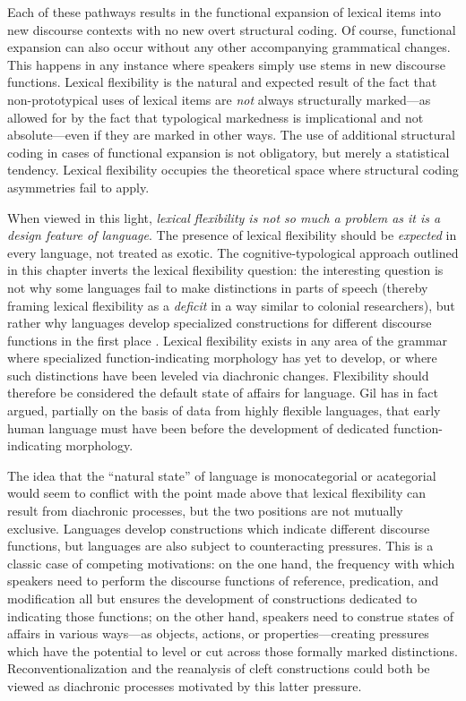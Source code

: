 Each of these pathways results in the functional expansion of lexical items into new discourse contexts with no new overt structural coding. Of course, functional expansion can also occur without any other accompanying grammatical changes. This happens in any instance where speakers simply use stems in new discourse functions. Lexical flexibility is the natural and expected result of the fact that non-prototypical uses of lexical items are \emph{not} always structurally marked—as allowed for by the fact that typological markedness is implicational and not absolute—even if they are marked in other ways. The use of additional structural coding in cases of functional expansion is not obligatory, but merely a statistical tendency. Lexical flexibility occupies the theoretical space where structural coding asymmetries fail to apply.

When viewed in this light, \emph{lexical flexibility is not so much a problem as it is a design feature of language}. The presence of lexical flexibility should be \emph{expected} in every language, not treated as exotic. The cognitive-typological approach outlined in this chapter inverts the lexical flexibility question: the interesting question is not why some languages fail to make distinctions in parts of speech (thereby framing lexical flexibility as a \emph{deficit} in a way similar to colonial researchers), but rather why languages develop specialized constructions for different discourse functions in the first place . Lexical flexibility exists in any area of the grammar where specialized function-indicating morphology has yet to develop, or where such distinctions have been leveled via diachronic changes. Flexibility should therefore be considered the default state of affairs for language. Gil \parencites*{Gil2005}{Gil2006} has in fact argued, partially on the basis of data from highly flexible languages, that early human language must have been  before the development of dedicated function-indicating morphology.

The idea that the \enquote{natural state} of language is monocategorial or acategorial would seem to conflict with the point made above that lexical flexibility can result from diachronic processes, but the two positions are not mutually exclusive. Languages develop constructions which indicate different discourse functions, but languages are also subject to counteracting pressures. This is a classic case of competing motivations: on the one hand, the frequency with which speakers need to perform the discourse functions of reference, predication, and modification all but ensures the development of constructions dedicated to indicating those functions; on the other hand, speakers need to construe states of affairs in various ways—as objects, actions, or properties—creating pressures which have the potential to level or cut across those formally marked distinctions. Reconventionalization and the reanalysis of cleft constructions could both be viewed as diachronic processes motivated by this latter pressure.

